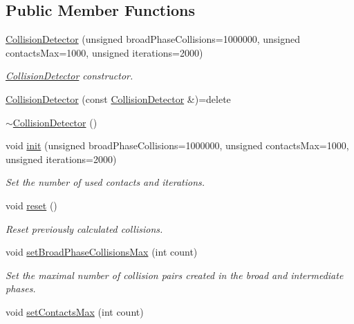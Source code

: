 \subsection*{Public Member Functions}
\begin{DoxyCompactItemize}
\item 
\mbox{\hyperlink{classr3_1_1_collision_detector_a8eaf42ee83c8bee06bc06601ec32c612}{Collision\+Detector}} (unsigned broad\+Phase\+Collisions=1000000, unsigned contacts\+Max=1000, unsigned iterations=2000)
\begin{DoxyCompactList}\small\item\em \mbox{\hyperlink{classr3_1_1_collision_detector}{Collision\+Detector}} constructor. \end{DoxyCompactList}\item 
\mbox{\hyperlink{classr3_1_1_collision_detector_ad44d67dd15e661d0e135016c89a7c9a4}{Collision\+Detector}} (const \mbox{\hyperlink{classr3_1_1_collision_detector}{Collision\+Detector}} \&)=delete
\item 
\mbox{\hyperlink{classr3_1_1_collision_detector_ab45ac57f6ab9bcab367e104e9423722a}{$\sim$\+Collision\+Detector}} ()
\item 
void \mbox{\hyperlink{classr3_1_1_collision_detector_a252e876b389dae66368afa210b93f31e}{init}} (unsigned broad\+Phase\+Collisions=1000000, unsigned contacts\+Max=1000, unsigned iterations=2000)
\begin{DoxyCompactList}\small\item\em Set the number of used contacts and iterations. \end{DoxyCompactList}\item 
void \mbox{\hyperlink{classr3_1_1_collision_detector_a8f9f9e0ecc67d950e79d024803dc916b}{reset}} ()
\begin{DoxyCompactList}\small\item\em Reset previously calculated collisions. \end{DoxyCompactList}\item 
void \mbox{\hyperlink{classr3_1_1_collision_detector_a386e4e4027a98c154423c8aea9079138}{set\+Broad\+Phase\+Collisions\+Max}} (int count)
\begin{DoxyCompactList}\small\item\em Set the maximal number of collision pairs created in the broad and intermediate phases. \end{DoxyCompactList}\item 
void \mbox{\hyperlink{classr3_1_1_collision_detector_a1920971e75d79df7806a8d803a010e62}{set\+Contacts\+Max}} (int count)

\end{DoxyCompactItemize}
